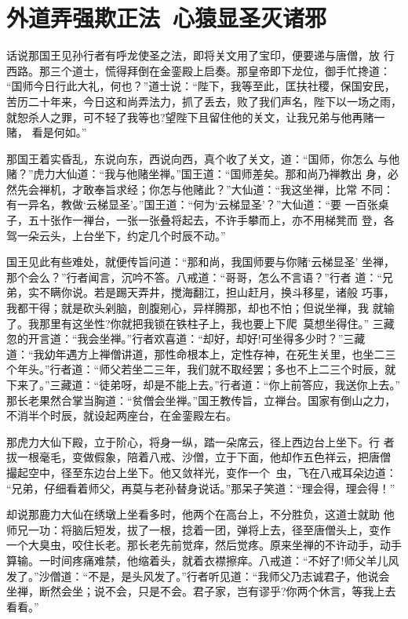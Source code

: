 \chapter{外道弄强欺正法~心猿显圣灭诸邪}

话说那国王见孙行者有呼龙使圣之法，即将关文用了宝印，便要递与唐僧，放
行西路。那三个道士，慌得拜倒在金銮殿上启奏。那皇帝即下龙位，御手忙搀道：
“国师今日行此大礼，何也？”道士说：“陛下，我等至此，匡扶社稷，保国安民，
苦历二十年来，今日这和尚弄法力，抓了丢去，败了我们声名，陛下以一场之雨，
就恕杀人之罪，可不轻了我等也?望陛下且留住他的关文，让我兄弟与他再赌一赌，
看是何如。”

那国王着实昏乱，东说向东，西说向西，真个收了关文，道：“国师，你怎么
与他赌？”虎力大仙道：“我与他赌坐禅。”国王道：“国师差矣。那和尚乃禅教出
身，必然先会禅机，才敢奉旨求经；你怎与他赌此？”大仙道：“我这坐禅，比常
不同：有一异名，教做‘云梯显圣’。”国王道：“何为‘云梯显圣’？”大仙道：“要
一百张桌子，五十张作一禅台，一张一张叠将起去，不许手攀而上，亦不用梯凳而
登，各驾一朵云头，上台坐下，约定几个时辰不动。”

国王见此有些难处，就便传旨问道：“那和尚，我国师要与你赌‘云梯显圣’
坐禅，那个会么？”行者闻言，沉吟不答。八戒道：“哥哥，怎么不言语？”行者
道：“兄弟，实不瞒你说。若是踢天弄井，搅海翻江，担山赶月，换斗移星，诸般
巧事，我都干得；就是砍头剁脑，剖腹剜心，异样腾那，却也不怕；但说坐禅，我
就输了。我那里有这坐性?你就把我锁在铁柱子上，我也要上下爬，莫想坐得住。”
三藏忽的开言道：“我会坐禅。”行者欢喜道：“却好，却好!可坐得多少时？”三藏
道：“我幼年遇方上禅僧讲道，那性命根本上，定性存神，在死生关里，也坐二三
个年头。”行者道：“师父若坐二三年，我们就不取经罢；多也不上二三个时辰，就
下来了。”三藏道：“徒弟呀，却是不能上去。”行者道：“你上前答应，我送你上去。”
那长老果然合掌当胸道：“贫僧会坐禅。”国王教传旨，立禅台。国家有倒山之力，
不消半个时辰，就设起两座台，在金銮殿左右。

那虎力大仙下殿，立于阶心，将身一纵，踏一朵席云，径上西边台上坐下。行
者拔一根毫毛，变做假象，陪着八戒、沙僧，立于下面，他却作五色祥云，把唐僧
撮起空中，径至东边台上坐下。他又敛祥光，变作一个虫，飞在八戒耳朵边道：
“兄弟，仔细看着师父，再莫与老孙替身说话。”那呆子笑道：“理会得，理会得！”

却说那鹿力大仙在绣墩上坐看多时，他两个在高台上，不分胜负，这道士就助
他师兄一功：将脑后短发，拔了一根，捻着一团，弹将上去，径至唐僧头上，变作
一个大臭虫，咬住长老。那长老先前觉痒，然后觉疼。原来坐禅的不许动手，动手
算输。一时间疼痛难禁，他缩着头，就着衣襟擦痒。八戒道：“不好了!师父羊儿风
发了。”沙僧道：“不是，是头风发了。”行者听见道：“我师父乃志诚君子，他说会
坐禅，断然会坐；说不会，只是不会。君子家，岂有谬乎?你两个休言，等我上去
看看。”

